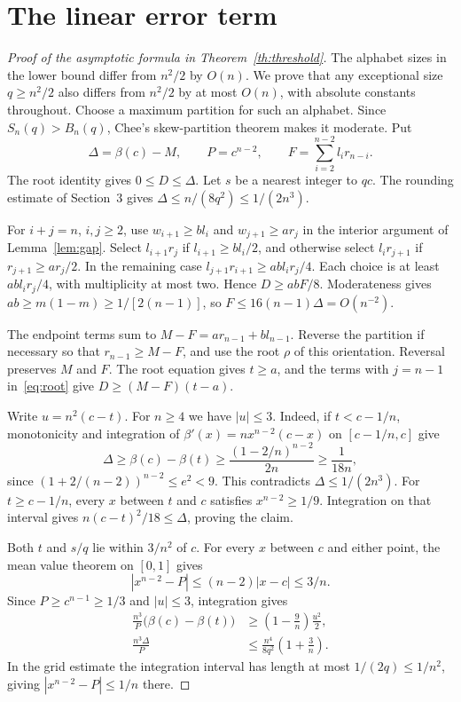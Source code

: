 \documentclass[11pt,a4paper]{article}
\begin{document}
\section{The linear error term}

\begin{proof}[Proof of the asymptotic formula in Theorem~\ref{th:threshold}]
The alphabet sizes in the lower bound differ from $n^2/2$ by $O(n)$. We prove that any exceptional size $q\ge n^2/2$ also differs from $n^2/2$ by at most $O(n)$, with absolute constants throughout. Choose a maximum partition for such an alphabet. Since $S_n(q)>B_n(q)$, Chee's skew-partition theorem makes it moderate. Put
\[
 \Delta=\beta(c)-M,\qquad P=c^{n-2},\qquad
 F=\sum_{i=2}^{n-2} l_i r_{n-i}.
\]
The root identity gives $0\le D\le\Delta$. Let $s$ be a nearest integer to $qc$. The rounding estimate of Section~3 gives $\Delta\le n/(8q^2)\le1/(2n^3)$.

For $i+j=n$, $i,j\ge2$, use $w_{i+1}\ge b l_i$ and $w_{j+1}\ge a r_j$ in the interior argument of Lemma~\ref{lem:gap}. Select $l_{i+1}r_j$ if $l_{i+1}\ge b l_i/2$, and otherwise select $l_i r_{j+1}$ if $r_{j+1}\ge a r_j/2$. In the remaining case $l_{j+1}r_{i+1}\ge ab l_i r_j/4$. Each choice is at least $ab l_i r_j/4$, with multiplicity at most two. Hence $D\ge abF/8$. Moderateness gives $ab\ge m(1-m)\ge1/[2(n-1)]$, so $F\le16(n-1)\Delta=O(n^{-2})$.

The endpoint terms sum to $M-F=a r_{n-1}+b l_{n-1}$. Reverse the partition if necessary so that $r_{n-1}\ge M-F$, and use the root $\rho$ of this orientation. Reversal preserves $M$ and $F$. The root equation gives $t\ge a$, and the terms with $j=n-1$ in~\eqref{eq:root} give $D\ge(M-F)(t-a)$.

Write $u=n^2(c-t)$. For $n\ge4$ we have $|u|\le3$. Indeed, if $t<c-1/n$, monotonicity and integration of $\beta'(x)=n x^{n-2}(c-x)$ on $[c-1/n,c]$ give
\[
 \Delta\ge\beta(c)-\beta(t)\ge\frac{(1-2/n)^{n-2}}{2n}\ge\frac1{18n},
\]
since $(1+2/(n-2))^{n-2}\le e^2<9$. This contradicts $\Delta\le1/(2n^3)$. For $t\ge c-1/n$, every $x$ between $t$ and $c$ satisfies $x^{n-2}\ge1/9$. Integration on that interval gives $n(c-t)^2/18\le\Delta$, proving the claim.

Both $t$ and $s/q$ lie within $3/n^2$ of $c$. For every $x$ between $c$ and either point, the mean value theorem on $[0,1]$ gives
\[
 |x^{n-2}-P|\le(n-2)|x-c|\le3/n .
\]
Since $P\ge c^{n-1}\ge1/3$ and $|u|\le3$, integration gives
\begin{align}
 \frac{n^3}{P}\bigl(\beta(c)-\beta(t)\bigr)
 &\ge\left(1-\frac9n\right)\frac{u^2}{2},\label{eq:sharploss}\\
 \frac{n^3\Delta}{P}
 &\le \frac{n^4}{8q^2}\left(1+\frac3n\right).\label{eq:sharpgrid}
\end{align}
In the grid estimate the integration interval has length at most $1/(2q)\le1/n^2$, giving $|x^{n-2}-P|\le1/n$ there.


\end{proof}
\end{document}
